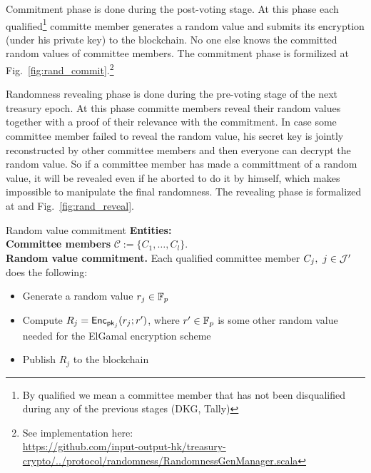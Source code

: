 Commitment phase is done during the post-voting stage. At this phase each qualified\footnote{By qualified we mean a committee member that has not been disqualified during any of the previous stages (DKG, Tally)} committe member generates a random value and submits its encryption (under his private key) to the blockchain. No one else knows the committed random values of committee members. The commitment phase is formilized at Fig.~\ref{fig:rand_commit}.\footnote{See implementation here:\\ \href{https://github.com/input-output-hk/treasury-crypto/blob/new_api/src/main/scala/io/iohk/protocol/randomness/RandomnessGenManager.scala}{https://github.com/input-output-hk/treasury-crypto/../protocol/randomness/RandomnessGenManager.scala}}

Randomness revealing phase is done during the pre-voting stage of the next treasury epoch. At this phase committe members reveal their random values together with a proof of their relevance with the commitment. In case some committee member failed to reveal the random value, his secret key is jointly reconstructed by other committee members and then everyone can decrypt the random value. So if a committee member has made a committment of a random value, it will be revealed even if he aborted to do it by himself, which makes impossible to manipulate the final randomness. The revealing phase is formalized at and Fig.~\ref{fig:rand_reveal}.

\begin{boxfig}{\label{fig:rand_commit}Random value commitment}{}
\footnotesize
\textbf{Entities:}\\
    \hspace*{6mm} \textbf{Committee members} $\mathcal{C}:=\{C_1,\ldots, C_l \}$.\\

\textbf{Random value commitment.}
Each qualified committee member $C_j,~j\in\mathcal{J}'$ does the following:
\begin{itemize}
	\item Generate a random value $r_j\in\mathbb{F}_p$
	\item Compute $R_j=\mathsf{Enc}_{\mathsf{pk}_j}(r_j;r')$, where $r'\in\mathbb{F}_p$ is some other random value needed for the ElGamal encryption scheme
    \item Publish $R_j$ to the blockchain
\end{itemize}
\end{boxfig}


